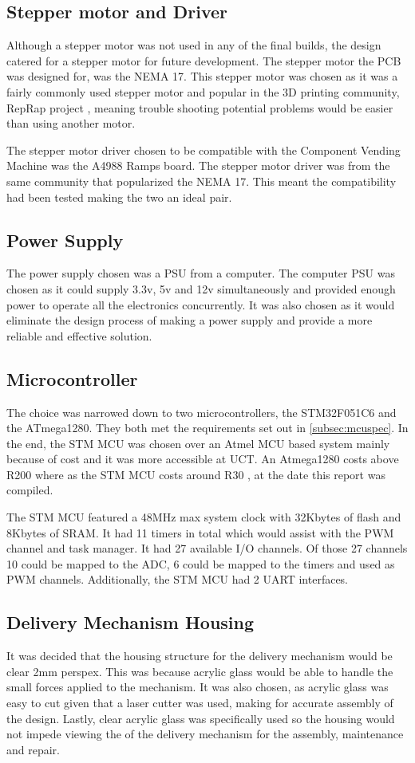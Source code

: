 \documentclass[a4paper,11pt]{article}
\newcommand*{\halfref}[1]{\hyperref[{#1}]{\autoref*{#1}}}
\numberwithin{figure}{section}
\numberwithin{table}{section}
\begin{document}
\subsection{Stepper motor and Driver}
Although a stepper motor was not used in any of the final builds, the design catered for a stepper motor for future development. The stepper motor the PCB was designed for, was the NEMA 17. This stepper motor was chosen as it was a fairly commonly used stepper motor and popular in the 3D printing community, RepRap project \cite{reprap}, meaning trouble shooting potential problems would be easier than using another motor.

The stepper motor driver chosen to be compatible with the Component Vending Machine was the A4988 Ramps board. The stepper motor driver was from the same community that popularized the NEMA 17. This meant the compatibility had been tested making the two an ideal pair.

\subsection{Power Supply}
The power supply chosen was a PSU from a computer. The computer PSU was chosen as it could supply 3.3v, 5v and 12v simultaneously and provided enough power to operate all the electronics concurrently. It was also chosen as it would eliminate the design process of making a power supply and provide a more reliable and effective solution.

\subsection{Microcontroller}
The choice was narrowed down to two microcontrollers, the STM32F051C6 and the ATmega1280. They both met the requirements set out in \halfref{subsec:mcuspec}. In the end, the STM MCU was chosen over an Atmel MCU based system mainly because of cost and it was more accessible at UCT. An Atmega1280 costs above R200 where as the STM MCU costs around R30 \cite{rsonline}, at the date this report was compiled. 

The STM MCU featured a 48MHz max system clock with 32Kbytes of flash and 8Kbytes of SRAM. It had 11 timers in total which would assist with the PWM channel and task manager. It had 27 available I/O channels. Of those 27 channels 10 could be mapped to the ADC, 6 could be mapped to the timers and used as PWM channels. Additionally, the STM MCU had 2 UART interfaces.

\subsection{Delivery Mechanism Housing}
It was decided that the housing structure for the delivery mechanism would be clear 2mm perspex. This was because acrylic glass would be able to handle the small forces applied to the mechanism. It was also chosen, as acrylic glass was easy to cut given that a laser cutter was used, making for accurate assembly of the design. Lastly, clear acrylic glass was specifically used so the housing would not impede viewing the of the delivery mechanism for the assembly, maintenance and repair. 
\end{document}
